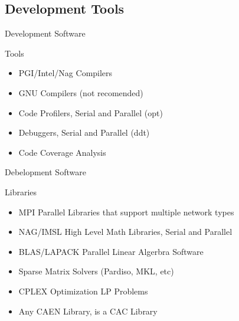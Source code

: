 \documentclass[handout]{beamer}
\begin{document}
    \subsection {Development Tools}
     \begin{frame}{Development Software}
      \begin{block}{Tools}
       \begin{itemize}
         \item PGI/Intel/Nag Compilers
         \item GNU Compilers (not recomended)
         \item Code Profilers, Serial and Parallel (opt)
         \item Debuggers, Serial and Parallel (ddt)
         \item Code Coverage Analysis 
       \end{itemize}
      \end{block}
     \end{frame}
     \begin{frame}{Debelopment Software}
      \begin{block}{Libraries}
        \begin{itemize}
         \item MPI Parallel Libraries that support multiple network types
         \item NAG/IMSL High Level Math Libraries, Serial and Parallel
         \item BLAS/LAPACK Parallel Linear Algerbra Software
         \item Sparse Matrix Solvers (Pardiso, MKL, etc)
         \item CPLEX Optimization LP Problems
         \item Any CAEN Library, is a CAC Library
        \end{itemize}
      \end{block}
     \end{frame}
\end{document}
